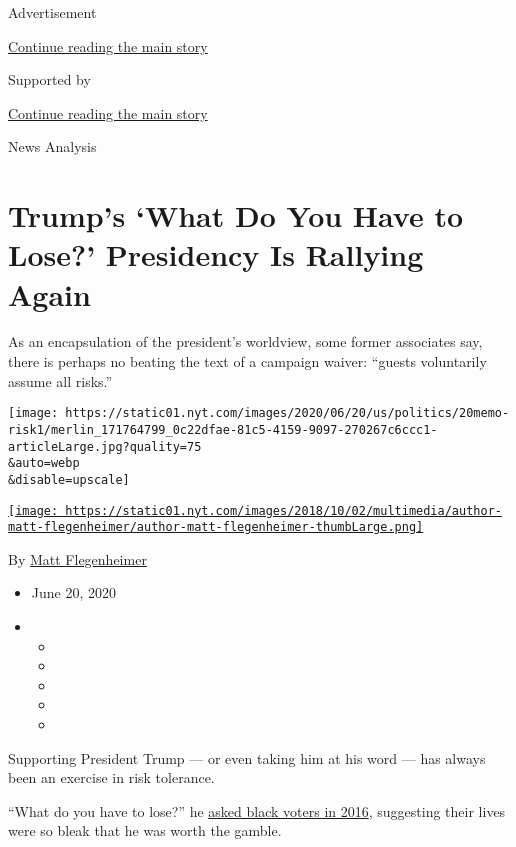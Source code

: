 Advertisement

\protect\hyperlink{after-top}{Continue reading the main story}

Supported by

\protect\hyperlink{after-sponsor}{Continue reading the main story}

News Analysis

\hypertarget{trumps-what-do-you-have-to-lose-presidency-is-rallying-again}{%
\section{Trump's `What Do You Have to Lose?' Presidency Is Rallying
Again}\label{trumps-what-do-you-have-to-lose-presidency-is-rallying-again}}

As an encapsulation of the president's worldview, some former associates
say, there is perhaps no beating the text of a campaign waiver: ``guests
voluntarily assume all risks.''

\texttt{[image: https://static01.nyt.com/images/2020/06/20/us/politics/20memo-risk1/merlin\_171764799\_0c22dfae-81c5-4159-9097-270267c6ccc1-articleLarge.jpg?quality=75\\\&auto=webp\\\&disable=upscale]}

\href{https://www.nytimes.com/by/matt-flegenheimer}{\texttt{[image: https://static01.nyt.com/images/2018/10/02/multimedia/author-matt-flegenheimer/author-matt-flegenheimer-thumbLarge.png]}}

By \href{https://www.nytimes.com/by/matt-flegenheimer}{Matt
Flegenheimer}

\begin{itemize}
\item
  June 20, 2020
\item
  \begin{itemize}
  \item
  \item
  \item
  \item
  \item
  \end{itemize}
\end{itemize}

Supporting President Trump --- or even taking him at his word --- has
always been an exercise in risk tolerance.

``What do you have to lose?'' he
\href{https://www.nytimes.com/2016/08/20/us/politics/donald-trump-speech.html}{asked
black voters in 2016}, suggesting their lives were so bleak that he was
worth the gamble.

